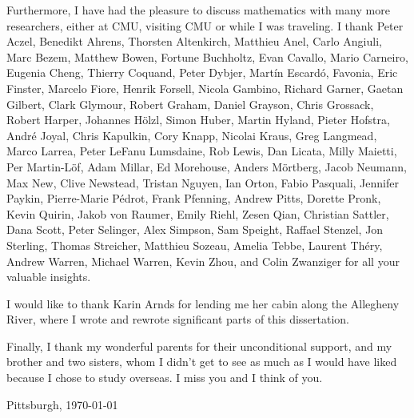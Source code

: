 Furthermore, I have had the pleasure to discuss mathematics with many more researchers, either at CMU, visiting CMU or while I was traveling. I thank Peter Aczel, Benedikt Ahrens, Thorsten Altenkirch, Matthieu Anel, Carlo Angiuli, Marc Bezem, Matthew Bowen, Fortune Buchholtz, Evan Cavallo, Mario Carneiro, Eugenia Cheng, Thierry Coquand, Peter Dybjer, Mart\'in Escard\'o, Favonia, Eric Finster, Marcelo Fiore, Henrik Forsell, Nicola Gambino, Richard Garner, Gaetan Gilbert, Clark Glymour, Robert Graham, Daniel Grayson, Chris Grossack, Robert Harper, Johannes H\"olzl, Simon Huber, Martin Hyland, Pieter Hofstra, André Joyal, Chris Kapulkin, Cory Knapp, Nicolai Kraus, Greg Langmead, Marco Larrea, Peter LeFanu Lumsdaine, Rob Lewis, Dan Licata, Milly Maietti, Per Martin-L\"of, Adam Millar, Ed Morehouse, Anders Mörtberg, Jacob Neumann, Max New, Clive Newstead, Tristan Nguyen, Ian Orton, Fabio Pasquali, Jennifer Paykin, Pierre-Marie Pédrot, Frank Pfenning, Andrew Pitts, Dorette Pronk, Kevin Quirin, Jakob von Raumer, Emily Riehl, Zesen Qian, Christian Sattler, Dana Scott, Peter Selinger, Alex Simpson, Sam Speight, Raffael Stenzel, Jon Sterling, Thomas Streicher, Matthieu Sozeau, Amelia Tebbe, Laurent Théry, Andrew Warren, Michael Warren, Kevin Zhou, and Colin Zwanziger for all your valuable insights.

I would like to thank Karin Arnds for lending me her cabin along the Allegheny River, where I wrote and rewrote significant parts of this dissertation.

Finally, I thank my wonderful parents for their unconditional support, and my brother and two sisters, whom I didn't get to see as much as I would have liked because I chose to study overseas. I miss you and I think of you.

\bigskip
\flushright
Pittsburgh, \today
